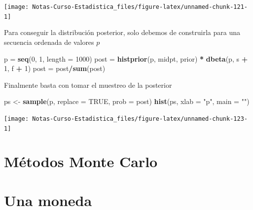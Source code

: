 \documentclass[
  12pt,
]{book}
\newenvironment{Shaded}{\begin{snugshade}}{\end{snugshade}}
\newcommand{\DataTypeTok}[1]{\textcolor[rgb]{0.13,0.29,0.53}{#1}}
\newcommand{\DecValTok}[1]{\textcolor[rgb]{0.00,0.00,0.81}{#1}}
\newcommand{\KeywordTok}[1]{\textcolor[rgb]{0.13,0.29,0.53}{\textbf{#1}}}
\newcommand{\NormalTok}[1]{#1}
\newcommand{\OperatorTok}[1]{\textcolor[rgb]{0.81,0.36,0.00}{\textbf{#1}}}
\newcommand{\OtherTok}[1]{\textcolor[rgb]{0.56,0.35,0.01}{#1}}
\newcommand{\StringTok}[1]{\textcolor[rgb]{0.31,0.60,0.02}{#1}}
\theoremstyle{definition}
\theoremstyle{definition}
\theoremstyle{definition}
\theoremstyle{remark}
\begin{document}
\begin{center}\texttt{[image: Notas-Curso-Estadistica\_files/figure-latex/unnamed-chunk-121-1]} \end{center}

Para conseguir la distribución posterior, solo debemos de construirla para una secuencia ordenada de valores \(p\)

\begin{Shaded}
\begin{Highlighting}[]
\NormalTok{p =}\StringTok{ }\KeywordTok{seq}\NormalTok{(}\DecValTok{0}\NormalTok{, }\DecValTok{1}\NormalTok{, }\DataTypeTok{length =} \DecValTok{1000}\NormalTok{)}
\NormalTok{post =}\StringTok{ }\KeywordTok{histprior}\NormalTok{(p, midpt, prior) }\OperatorTok{*}\StringTok{ }\KeywordTok{dbeta}\NormalTok{(p, s }\OperatorTok{+}\StringTok{ }\DecValTok{1}\NormalTok{, }
\NormalTok{    f }\OperatorTok{+}\StringTok{ }\DecValTok{1}\NormalTok{)}
\NormalTok{post =}\StringTok{ }\NormalTok{post}\OperatorTok{/}\KeywordTok{sum}\NormalTok{(post)}
\end{Highlighting}
\end{Shaded}

Finalmente basta con tomar el muestreo de la posterior

\begin{Shaded}
\begin{Highlighting}[]
\NormalTok{ps <-}\StringTok{ }\KeywordTok{sample}\NormalTok{(p, }\DataTypeTok{replace =} \OtherTok{TRUE}\NormalTok{, }\DataTypeTok{prob =}\NormalTok{ post)}
\KeywordTok{hist}\NormalTok{(ps, }\DataTypeTok{xlab =} \StringTok{"p"}\NormalTok{, }\DataTypeTok{main =} \StringTok{""}\NormalTok{)}
\end{Highlighting}
\end{Shaded}

\begin{center}\texttt{[image: Notas-Curso-Estadistica\_files/figure-latex/unnamed-chunk-123-1]} \end{center}

\hypertarget{muxe9todos-monte-carlo}{%
\section{Métodos Monte Carlo}\label{muxe9todos-monte-carlo}}

\hypertarget{una-moneda}{%
\section{Una moneda}\label{una-moneda}}
\end{document}
